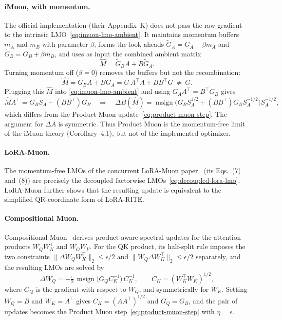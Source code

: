 \documentclass[11pt]{article}
\DeclareMathOperator{\msign}{msign}          %
\newcommand{\norm}[1]{\| #1\|}
\theoremstyle{plain}
\theoremstyle{definition}
\theoremstyle{remark}
\theoremstyle{definition}
\begin{document}
\paragraph{iMuon, with momentum.} The official implementation (their Appendix~K) does not pass the raw gradient to the intrinsic LMO~\eqref{eq:imuon-lmo-ambient}. It maintains momentum buffers $m_A$ and $m_B$ with parameter $\beta$, forms the look-aheads $\widetilde{G}_A=G_A+\beta m_A$ and $\widetilde{G}_B=G_B+\beta m_B$, and uses as input the combined ambient matrix
\begin{equation*}
  \widehat M=\widetilde{G}_B A+B\widetilde{G}_A .
\end{equation*}
Turning momentum off ($\beta=0$) removes the buffers but not the recombination:
\begin{equation*}
  \widehat M=G_B A+B G_A=G\,A^\top A+BB^\top G\ \neq\ G .
\end{equation*}
Plugging this $\widehat M$ into \eqref{eq:imuon-lmo-ambient} and using $G_A A^\top=B^\top G_B$ gives
\begin{equation}\label{eq:imuon-implemented}
  \widehat M A^\top=G_B S_A+(BB^\top)G_B
  \quad\Longrightarrow\quad
  \Delta B(\widehat M)=\msign\!\big(G_B S_A^{1/2}+(BB^\top)G_B S_A^{-1/2}\big)S_A^{-1/2},
\end{equation}
which differs from the Product Muon update~\eqref{eq:product-muon-step}. The argument for $\Delta A$ is symmetric. Thus Product Muon is the momentum-free limit of the iMuon theory (Corollary~4.1), but not of the implemented optimizer.


\paragraph{LoRA-Muon.}
The momentum-free LMOs of the concurrent LoRA-Muon paper~\cite{loramuon} (its Eqs.~(7) and~(8)) are precisely the decoupled factorwise LMOs~\eqref{eq:decoupled-lora-lmo}. LoRA-Muon further shows that the resulting update is equivalent to the simplified QR-coordinate form of LoRA-RITE.


\paragraph{Compositional Muon.}
Compositional Muon~\cite{tilde_csd} derives product-aware spectral updates for the attention products $W_QW_K^\top$ and $W_OW_V$. For the QK product, its half-split rule imposes the two constraints $\norm{\Delta W_Q W_K^\top}_2\le\epsilon/2$ and $\norm{W_Q\Delta W_K^\top}_2\le\epsilon/2$ separately, and the resulting LMOs are solved by
\[
  \Delta W_Q=-\tfrac{\epsilon}{2}\,\msign\!\big(G_Q C_K^{-1}\big)\,C_K^{-1},
  \qquad C_K=(W_K^\top W_K)^{1/2},
\]
where $G_Q$ is the gradient with respect to $W_Q$, and symmetrically for $W_K$. Setting $W_Q=B$ and $W_K=A^\top$ gives $C_K=(AA^\top)^{1/2}$ and $G_Q=G_B$, and the pair of updates becomes the Product Muon step~\eqref{eq:product-muon-step} with $\eta=\epsilon$.
\end{document}
